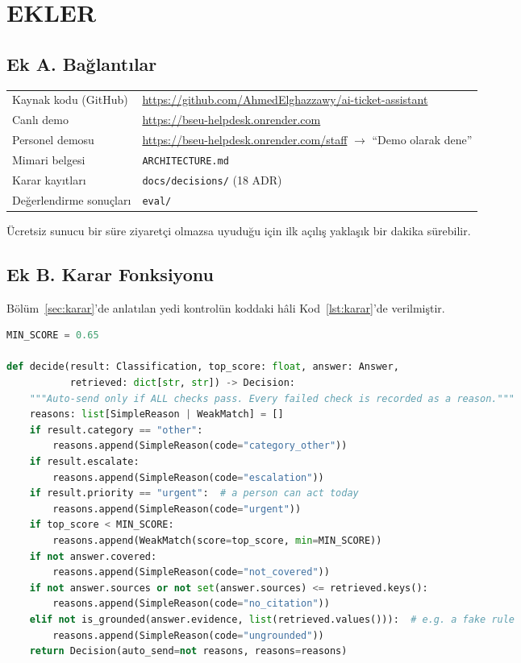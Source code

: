 \chapter{EKLER}

\section*{Ek A. Bağlantılar}

{\small\begin{tabularx}{\textwidth}{@{}l X@{}}
Kaynak kodu (GitHub) & \url{https://github.com/AhmedElghazzawy/ai-ticket-assistant} \\
Canlı demo & \url{https://bseu-helpdesk.onrender.com} \\
Personel demosu & \url{https://bseu-helpdesk.onrender.com/staff} $\rightarrow$ ``Demo olarak dene'' \\
Mimari belgesi & \texttt{ARCHITECTURE.md} \\
Karar kayıtları & \texttt{docs/decisions/} (18 ADR) \\
Değerlendirme sonuçları & \texttt{eval/} \\
\end{tabularx}}

Ücretsiz sunucu bir süre ziyaretçi olmazsa uyuduğu için ilk açılış yaklaşık bir dakika sürebilir.

\section*{Ek B. Karar Fonksiyonu}

Bölüm~\ref{sec:karar}'de anlatılan yedi kontrolün koddaki hâli Kod~\ref{lst:karar}'de verilmiştir.

\begin{lstlisting}[language=Python, caption={Otomatik gönderim kararı (\texttt{domain/decision.py})}, label={lst:karar}]
MIN_SCORE = 0.65

def decide(result: Classification, top_score: float, answer: Answer,
           retrieved: dict[str, str]) -> Decision:
    """Auto-send only if ALL checks pass. Every failed check is recorded as a reason."""
    reasons: list[SimpleReason | WeakMatch] = []
    if result.category == "other":
        reasons.append(SimpleReason(code="category_other"))
    if result.escalate:
        reasons.append(SimpleReason(code="escalation"))
    if result.priority == "urgent":  # a person can act today
        reasons.append(SimpleReason(code="urgent"))
    if top_score < MIN_SCORE:
        reasons.append(WeakMatch(score=top_score, min=MIN_SCORE))
    if not answer.covered:
        reasons.append(SimpleReason(code="not_covered"))
    if not answer.sources or not set(answer.sources) <= retrieved.keys():
        reasons.append(SimpleReason(code="no_citation"))
    elif not is_grounded(answer.evidence, list(retrieved.values())):  # e.g. a fake rule
        reasons.append(SimpleReason(code="ungrounded"))
    return Decision(auto_send=not reasons, reasons=reasons)
\end{lstlisting}

